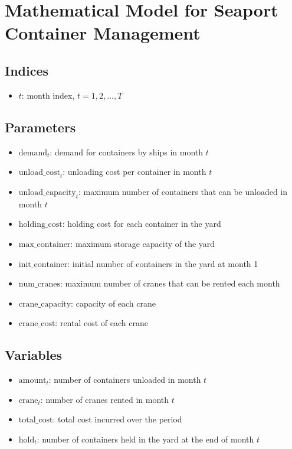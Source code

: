 \documentclass{article}
\begin{document}
\section*{Mathematical Model for Seaport Container Management}

\subsection*{Indices}
\begin{itemize}
    \item \( t \): month index, \( t = 1, 2, \ldots, T \)
\end{itemize}

\subsection*{Parameters}
\begin{itemize}
    \item \( \text{demand}_{t} \): demand for containers by ships in month \( t \) 
    \item \( \text{unload\_cost}_{t} \): unloading cost per container in month \( t \)
    \item \( \text{unload\_capacity}_{t} \): maximum number of containers that can be unloaded in month \( t \)
    \item \( \text{holding\_cost} \): holding cost for each container in the yard
    \item \( \text{max\_container} \): maximum storage capacity of the yard
    \item \( \text{init\_container} \): initial number of containers in the yard at month 1
    \item \( \text{num\_cranes} \): maximum number of cranes that can be rented each month
    \item \( \text{crane\_capacity} \): capacity of each crane
    \item \( \text{crane\_cost} \): rental cost of each crane
\end{itemize}

\subsection*{Variables}
\begin{itemize}
    \item \( \text{amount}_{t} \): number of containers unloaded in month \( t \)
    \item \( \text{crane}_{t} \): number of cranes rented in month \( t \)
    \item \( \text{total\_cost} \): total cost incurred over the period
    \item \( \text{hold}_{t} \): number of containers held in the yard at the end of month \( t \)
\end{itemize}
\end{document}
